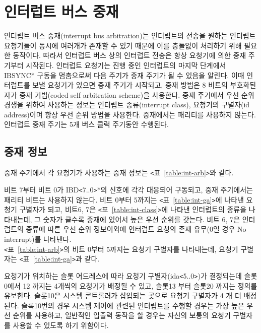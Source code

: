 \section{인터럽트 버스 중재}
인터럽트 버스 중재(interrupt bus arbitration)는 인터럽트의 전송을 원하는
인터럽트 요청기들이 동시에 여러개가 존재할
수 있기 때문에 이를 충돌없이 처리하기 위해 필요한 동작이다. 
따라서 인터럽트 버스 상의 인터럽트 전송은 항상 요청기에 의한 중재 주기부터 시작된다.
인터럽트 요청기는 진행 중인 인터럽트의 마지막 단계에서 IBSYNC* 구동을 멈춤으로써
다음 주기가 중재 주기가 될 수 있음을 알린다.
이때 인터럽트를 보낼 요청기가 있으면 중재 주기가 시작되고,
중재 방법은 8 비트의 부호화된 자가 중재 기법(coded self arbitration scheme)을 사용한다.
중재 주기에서 우선 순위 경쟁을 위하여 사용하는 정보는 인터럽트 종류(interrupt class),
요청기의 구별자(id address)이며 항상 우선 순위 방법을 사용한다.
중재에서는 패리티를 사용하지 않는다.
인터럽트 중재 주기는 5개 버스 클럭 주기동안 수행된다. \\
%
\subsection{중재 정보}
중재 주기에서 각 요청기가 사용하는 중재 정보는 {\tt <}표~\ref{table:int-arb}{\tt >}와 같다.

비트 7부터 비트 0가 IBD{\tt <}7..0{\tt >}*의 신호에 각각 대응되어 구동되고,
중재 주기에서는 패리티 비트는 사용하지 않는다.
비트 0부터 5까지는 {\tt <}표~\ref{table:int-ga}{\tt >}에
나타낸 요청기 구별자가 되고,
비트6, 7은 {\tt <}표~\ref{table:int-class}{\tt >}에 나타낸 인터럽트의 종류을 나타내는데, 
그 숫자가 클수록 중재에 있어서 높은 우선 순위를 갖는다.
비트 6, 7은 인터럽트의 종류에 따른 우선 순위 정보이외에
인터럽트 요청의 존재 유무(0일 경우 No interrupt)를 나타낸다. \\
{\tt <}표~\ref{table:int-arb}{\tt >}의 비트 0부터 5까지는 요청기 구별자를 나타내는데,
요청기 구별자는 {\tt <}표~\ref{table:int-ga}{\tt >}과 같다.

요청기가 위치하는 슬롯 어드레스에 따라 요청기 구별자(ida{\tt <}5..0{\tt >})가
결정되는데 슬롯0에서 12 까지는 4개씩의 요청기가 배정될 수 있고,
슬롯13 부터 슬롯20 까지는 정의를 유보한다.
슬롯10은 시스템 콘트롤러가 삽입되는 곳으로 요청기 구별자가 4 개 더 배정된다.
슬록10번의 경우 시스템 제어에 관련된 인터럽트를 수행할 경우는 
가장 높은 우선 순위를 사용하고, 일반적인 입출력 동작을 할 경우는 자신의 보통의 요청기 구별자를
사용할 수 있도록 하기 위함이다.
%

